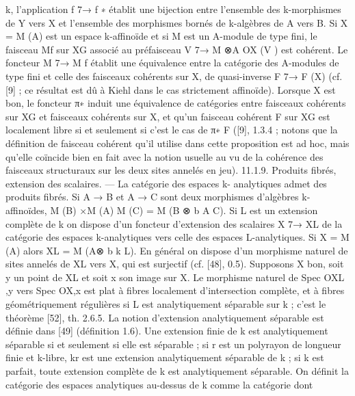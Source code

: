 \documentclass[
  10pt,
]{article}
\newenvironment{Shaded}{}{}
\newcommand{\NormalTok}[1]{#1}
\begin{document}
\begin{Shaded}
\begin{Highlighting}[]
\NormalTok{k, l’application f 7→ f ∗ établit une bijection entre l’ensemble des k{-}morphismes de Y}
\NormalTok{vers X et l’ensemble des morphismes bornés de k{-}algèbres de A vers B.}
\NormalTok{   Si X = M (A) est un espace k{-}affinoïde et si M est un A{-}module de type fini, le}
\NormalTok{faisceau Mf sur XG associé au préfaisceau V 7→ M ⊗A OX (V ) est cohérent. Le foncteur}
\NormalTok{M 7→ M f établit une équivalence entre la catégorie des A{-}modules de type fini et celle}
\NormalTok{des faisceaux cohérents sur X, de quasi{-}inverse F 7→ F (X) (cf. [9] ; ce résultat est dû}
\NormalTok{à Kiehl dans le cas strictement affinoïde).}
\NormalTok{   Lorsque X est bon, le foncteur π∗ induit une équivalence de catégories entre faisceaux}
\NormalTok{cohérents sur XG et faisceaux cohérents sur X, et qu’un faisceau cohérent F sur XG est}
\NormalTok{localement libre si et seulement si c’est le cas de π∗ F ([9], 1.3.4 ; notons que la définition}
\NormalTok{de faisceau cohérent qu’il utilise dans cette proposition est ad hoc, mais qu’elle coïncide}
\NormalTok{bien en fait avec la notion usuelle au vu de la cohérence des faisceaux structuraux sur}
\NormalTok{les deux sites annelés en jeu).}
\NormalTok{11.1.9. Produits fibrés, extension des scalaires. — La catégorie des espaces k{-}}
\NormalTok{analytiques admet des produits fibrés. Si A → B et A → C sont deux morphismes}
\NormalTok{d’algèbres k{-}affinoïdes, M (B) ×M (A) M (C) = M (B ⊗     b A C).}
\NormalTok{   Si L est un extension complète de k on dispose d’un foncteur d’extension des scalaires}
\NormalTok{X 7→ XL de la catégorie des espaces k{-}analytiques vers celle des espaces L{-}analytiques.}
\NormalTok{Si X = M (A) alors XL = M (A⊗       b k L). En général on dispose d’un morphisme naturel}
\NormalTok{de sites annelés de XL vers X, qui est surjectif (cf. [48], 0.5).}
\NormalTok{   Supposons X bon, soit y un point de XL et soit x son image sur X. Le morphisme}
\NormalTok{naturel de Spec OXL ,y vers Spec OX,x est plat à fibres localement d’intersection complète,}
\NormalTok{et à fibres géométriquement régulières si L est analytiquement séparable sur k ; c’est le}
\NormalTok{théorème [52], th. 2.6.5. La notion d’extension analytiquement séparable est définie}
\NormalTok{dans [49] (définition 1.6). Une extension finie de k est analytiquement séparable si et}
\NormalTok{seulement si elle est séparable ; si r est un polyrayon de longueur finie et k{-}libre, kr est}
\NormalTok{une extension analytiquement séparable de k ; si k est parfait, toute extension complète}
\NormalTok{de k est analytiquement séparable.}
\NormalTok{   On définit la catégorie des espaces analytiques au{-}dessus de k comme la catégorie dont}
\end{Highlighting}
\end{Shaded}
\end{document}
